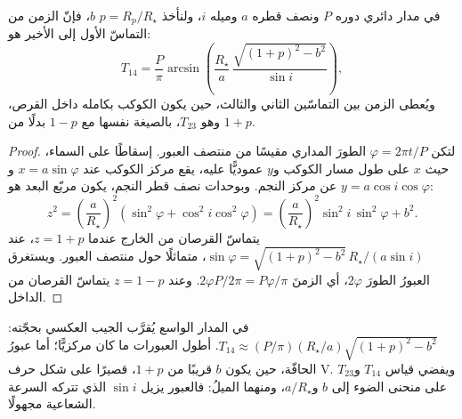 \begin{theorem}[مدّة العبور]\label{thm:b3:exoplanets:duration}
في مدار دائري دوره $P$ ونصف قطره $a$ وميله $i$، ولنأخذ
$p = R_p/R_\star$  $b$، فإنّ الزمن من التماسّ الأول
إلى الأخير هو:
\[
T_{14} = \frac{P}{\pi}\arcsin\!\left(\frac{R_\star}{a}\,
          \frac{\sqrt{(1 + p)^2 - b^2}}{\sin i}\right),
\]
ويُعطى الزمن بين التماسّين الثاني والثالث، حين يكون الكوكب
بكامله داخل القرص، وهو $T_{23}$، بالصيغة نفسها مع
$1 - p$ بدلًا من $1 + p$.
\end{theorem}

\begin{proof}
لتكن $\varphi = 2\pi t/P$ الطورَ المداري مقيسًا من منتصف العبور.
إسقاطًا على السماء، حيث $x$ على طول مسار الكوكب و$y$ عموديًّا عليه،
يقع مركز الكوكب عند $x = a\sin\varphi$ و$y = a\cos i\cos\varphi$
عن مركز النجم. وبوحدات نصف قطر النجم، يكون مربّع البعد هو:
\[
z^2 = \left(\frac{a}{R_\star}\right)^2(\sin^2\varphi + \cos^2 i\cos^2\varphi)
    = \left(\frac{a}{R_\star}\right)^2\sin^2 i\,\sin^2\varphi + b^2 .
\]
يتماسّ القرصان من الخارج عندما $z = 1 + p$، عند
$\sin\varphi = \sqrt{(1 + p)^2 - b^2}\,R_\star/(a\sin i)$، متماثلًا
حول منتصف العبور. ويستغرق العبورُ الطورَ $2\varphi$، أي الزمنَ
$2\varphi P/2\pi = P\varphi/\pi$. وعند $z = 1 - p$ يتماسّ القرصان
من الداخل.
\end{proof}

في المدار الواسع يُقرَّب الجيب العكسي بحجّته: $T_{14} \approx (P/\pi)
(R_\star/a)\sqrt{(1 + p)^2 - b^2}$. أطول العبورات ما كان مركزيًّا؛ أما
عبورُ الحافّة، حين يكون $b$ قريبًا من $1 + p$، قصيرًا على شكل حرف V. ويفضي قياس
$T_{14}$ و$T_{23}$ على منحنى الضوء إلى $b$ و$a/R_\star$، ومنهما
الميلُ: فالعبور يزيل $\sin i$ الذي تتركه السرعة الشعاعية
مجهولًا.

